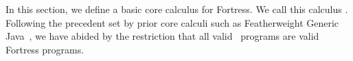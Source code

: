 %
%
%
%

\section{\basiccore}\label{basic-calculus}

In this section, we define a basic core calculus for Fortress.
We call this calculus \emph{\basiccore}.
Following the precedent set by prior core calculi such as Featherweight
Generic Java~\cite{fgj},
we have abided by the restriction that all valid \basiccore\ programs are
valid Fortress programs.




